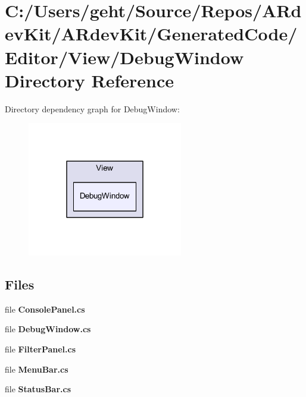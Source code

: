 \section{C\-:/\-Users/geht/\-Source/\-Repos/\-A\-Rdev\-Kit/\-A\-Rdev\-Kit/\-Generated\-Code/\-Editor/\-View/\-Debug\-Window Directory Reference}
\label{dir_dda1c2c093674dc1dde5e727445d0c8d}
Directory dependency graph for Debug\-Window\-:
\nopagebreak
\begin{figure}[H]
\begin{center}
\leavevmode
\includegraphics[width=192pt]{dir_dda1c2c093674dc1dde5e727445d0c8d_dep}
\end{center}
\end{figure}
\subsection*{Files}
\begin{DoxyCompactItemize}
\item 
file {\bfseries Console\-Panel.\-cs}
\item 
file {\bfseries Debug\-Window.\-cs}
\item 
file {\bfseries Filter\-Panel.\-cs}
\item 
file {\bfseries Menu\-Bar.\-cs}
\item 
file {\bfseries Status\-Bar.\-cs}
\end{DoxyCompactItemize}
